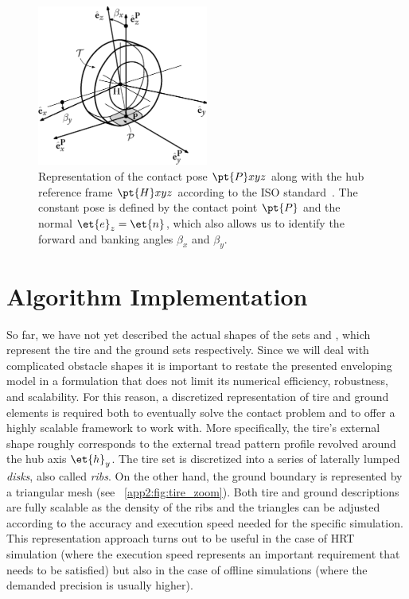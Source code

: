 \begin{figure}[!htb]
  \centering
  \includegraphics[width=0.5\textwidth]{./figures/appendix_2/tire_iso}
  \caption{Representation of the contact pose $\pt{P}xyz$ along with the hub reference frame $\pt{H}xyz$ according to the ISO standard~\cite{iso88552011}. The constant pose is defined by the contact point $\pt{P}$ and the normal $\et{e}_z = \et{n}$, which also allows us to identify the forward and banking angles $\beta_x$ and $\beta_y$.}
  \label{app2:fig:tire_iso}
\end{figure}


\section{Algorithm Implementation}
\label{app2:sec:algorithm_implementation}

So far, we have not yet described the actual shapes of the sets  and , which represent the tire and the ground sets respectively. Since we will deal with complicated obstacle shapes it is important to restate the presented enveloping model in a formulation that does not limit its numerical efficiency, robustness, and scalability. For this reason, a discretized representation of tire and ground elements is required both to eventually solve the contact problem and to offer a highly scalable framework to work with. More specifically, the tire's external shape roughly corresponds to the external tread pattern profile revolved around the hub axis $\et{h}_y$. The tire set is discretized into a series of laterally lumped \emph{disks}, also called \emph{ribs}. On the other hand, the ground boundary is represented by a triangular mesh (see \figurename{}~\ref{app2:fig:tire_zoom}). Both tire and ground descriptions are fully scalable as the density of the ribs and the triangles can be adjusted according to the accuracy and execution speed needed for the specific simulation. This representation approach turns out to be useful in the case of \ac{HRT} simulation (where the execution speed represents an important requirement that needs to be satisfied) but also in the case of offline simulations (where the demanded precision is usually higher).

